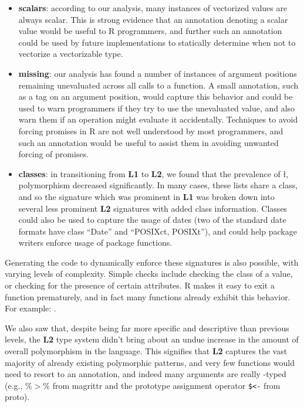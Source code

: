 \documentclass[acmsmall,10pt,review,anonymous]{acmart}\settopmatter{printfolios=true,printccs=false,printacmref=false}
\begin{document}
\begin{itemize}

	\item {\bf scalars}: according to our analysis, many instances of vectorized values are always scalar.
	This is strong evidence that an annotation denoting a scalar value would be useful to R programmers, and further such an annotation could be used by future implementations to statically determine when not to vectorize a vectorizable type.
	
	\item {\bf missing}: our analysis has found a number of instances of argument positions remaining unevaluated across all calls to a function.
	A small annotation, such as a tag on an argument position, would capture this behavior and could be used to warn programmers if they try to use the unevaluated value, and also warn them if an operation might evaluate it accidentally.
	Techniques to avoid forcing promises in R are not well understood by most programmers, and such an annotation would be useful to assist them in avoiding unwanted forcing of promises.

	\item {\bf classes}: in transitioning from {\bf L1} to {\bf L2}, we found that the prevalence of \l,  polymorphism decreased significantly.
	In many cases, these lists share a class, and so the signature which was prominent in {\bf L1} was broken down into several less prominent {\bf L2} signatures with added class information.
	Classes could also be used to capture the usage of dates (two of the standard date formats have class ``Date'' and ``POSIXct, POSIXt''), and could help package writers enforce usage of package functions.

\end{itemize}

Generating the code to dynamically enforce these signatures is also possible, with varying levels of complexity.
Simple checks include checking the class of a value, or checking for the presence of certain attributes.
R makes it easy to exit a function prematurely, and in fact many functions already exhibit this behavior.
For example: .

We also saw that, despite being far more specific and descriptive than previous levels, the {\bf L2} type system didn't bring about an undue increase in the amount of overall polymorphism in the language.
This signifies that {\bf L2} captures the vast majority of already existing polymorphic patterns, and very few functions would need to resort to an \ANY annotation, and indeed many arguments are really \ANY-typed (e.g., \%$>$\% from magrittr and the prototype assignment operator {\tt \$<-} from proto).
\end{document}
